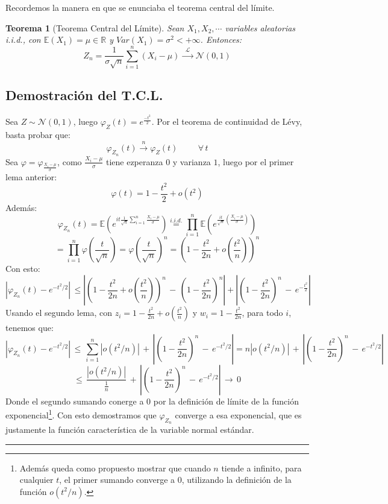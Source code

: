 \documentclass[a4paper]{article}
\newtheorem{teorema}{Teorema}
\numberwithin{equation}{subsection}
\def\R{\mathbb R}
\def\E{\mathbb E}
\begin{document}
Recordemos la manera en que se enunciaba el teorema central del límite.
\begin{teorema}[Teorema Central del Límite] Sean $X_1,X_2,\cdots$ variables aleatorias \textit{i.i.d.}, con $\E(X_1)=\mu\in\R$ y $Var(X_1)=\sigma^2<+\infty$. Entonces:
\[Z_n = \frac{1}{\sigma \sqrt{n}}\sum_{i=1}^{n}\left(X_i-\mu\right)\,\xrightarrow{\,\,\mathcal{L}\,\,}\,\mathcal{N}(0,1)\]
\end{teorema}
\subsection{Demostración del T.C.L.}
Sea $Z\sim \mathcal{N}(0,1)$, luego $\varphi_Z(t) = e^{\frac{-t^2}{2}}$. Por el teorema de continuidad de Lévy, basta probar que:
\[\varphi_{Z_n}(t)\xrightarrow{\,\,n\,\,}\varphi_Z(t)\hspace{1cm}\forall\,t\]
Sea $\varphi = \varphi_{\frac{X_i-\mu}{\sigma}}$, como $\frac{X_i-\mu}{\sigma}$ tiene ezperanza $0$ y varianza $1$, luego por el primer lema anterior:
\[\varphi(t) = 1-\frac{t^2}{2} + o(t^2)\]
Además: 
\[\varphi_{Z_n}(t) = \E(e^{it\frac{1}{\sqrt{n}}\sum_{i=1}^n\frac{X_i-\mu}{\sigma}}) \overset{i.i.d.}{=} \prod_{i=1}^n\E\left(e^{\frac{it}{\sqrt{n}}\left(\frac{X_i-\mu}{\sigma}\right)}\right)\]
\[ = \prod_{i=1}^n \varphi(\frac{t}{\sqrt{n}}) = \varphi(\frac{t}{\sqrt{n}})^n = \left(1-\frac{t^2}{2n}+o(\frac{t^2}{n})\right)^n\]
Con esto:
\[\left|\varphi_{Z_n}(t) - e^{-t^2/2}\right|\,\leq \left|\left(1-\frac{t^2}{2n}+o(\frac{t^2}{n})\right)^n\,-\,\left(1-\frac{t^2}{2n}\right)^n\right| + \left|\left(1-\frac{t^2}{2n}\right)^n\,-\,e^{-\frac{t^2}{2}}\right|\]
Usando el segundo lema, con $z_i = 1-\frac{t^2}{2n}+o(\frac{t^2}{n})$ y $w_i = 1-\frac{t^2}{2n}$, para todo $i$, tenemos que:
\[\left|\varphi_{Z_n}(t) - e^{-t^2/2}\right|\,\leq\,\sum_{i=1}^n\left|o(t^2/n)\right| \,+\, \left|\left(1-\frac{t^2}{2n}\right)^n\,-\,e^{-t^2/2}\right| = n|o(t^2/n)|\,+\,\left|\left(1-\frac{t^2}{2n}\right)^n\,-\,e^{-t^2/2}\right|\]
\[\leq\,\frac{|o(t^2/n)|}{\frac{1}{n}}\,+\,\left|\left(1-\frac{t^2}{2n}\right)^n\,-\,e^{-t^2/2}\right|\,\rightarrow\,0\]
Donde el segundo sumando conerge a 0 por la definición de límite de la función exponencial\footnote{Además queda como propuesto mostrar que cuando $n$ tiende a infinito, para cualquier $t$, el primer sumando converge a 0, utilizando la definición de la función $o(t^2/n)$.}. Con esto demostramos que $\varphi_{Z_n}$ converge a esa exponencial, que es justamente la función característica de la variable normal estándar. \rule{0.7em}{0.7em}
\end{document}
